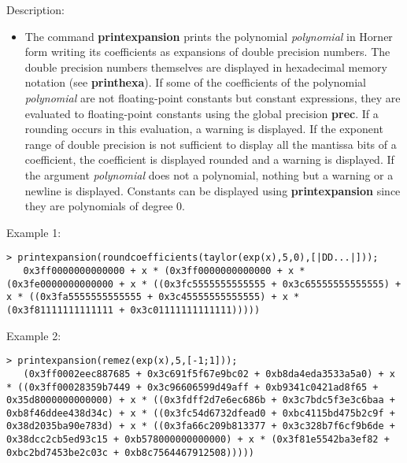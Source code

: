 \noindent Description: \begin{itemize}

\item The command \textbf{printexpansion} prints the polynomial \emph{polynomial} in Horner form
   writing its coefficients as expansions of double precision
   numbers. The double precision numbers themselves are displayed in
   hexadecimal memory notation (see \textbf{printhexa}). 
   If some of the coefficients of the polynomial \emph{polynomial} are not
   floating-point constants but constant expressions, they are evaluated
   to floating-point constants using the global precision \textbf{prec}.  If a
   rounding occurs in this evaluation, a warning is displayed.
   If the exponent range of double precision is not sufficient to display
   all the mantissa bits of a coefficient, the coefficient is displayed
   rounded and a warning is displayed.
   If the argument \emph{polynomial} does not a polynomial, nothing but a
   warning or a newline is displayed. Constants can be displayed using
   \textbf{printexpansion} since they are polynomials of degree $0$.
\end{itemize}
\noindent Example 1: 
\begin{center}\begin{minipage}{14.8cm}\begin{Verbatim}[frame=single]
   > printexpansion(roundcoefficients(taylor(exp(x),5,0),[|DD...|]));
   0x3ff0000000000000 + x * (0x3ff0000000000000 + x * (0x3fe0000000000000 + x * ((0x3fc5555555555555 + 0x3c65555555555555) + x * ((0x3fa5555555555555 + 0x3c45555555555555) + x * (0x3f81111111111111 + 0x3c01111111111111)))))
\end{Verbatim}
\end{minipage}\end{center}
\noindent Example 2: 
\begin{center}\begin{minipage}{14.8cm}\begin{Verbatim}[frame=single]
   > printexpansion(remez(exp(x),5,[-1;1]));
   (0x3ff0002eec887685 + 0x3c691f5f67e9bc02 + 0xb8da4eda3533a5a0) + x * ((0x3ff00028359b7449 + 0x3c96606599d49aff + 0xb9341c0421ad8f65 + 0x35d8000000000000) + x * ((0x3fdff2d7e6ec686b + 0x3c7bdc5f3e3c6baa + 0xb8f46ddee438d34c) + x * ((0x3fc54d6732dfead0 + 0xbc4115bd475b2c9f + 0x38d2035ba90e783d) + x * ((0x3fa66c209b813377 + 0x3c328b7f6cf9b6de + 0x38dcc2cb5ed93c15 + 0xb578000000000000) + x * (0x3f81e5542ba3ef82 + 0xbc2bd7453be2c03c + 0xb8c7564467912508)))))
\end{Verbatim}
\end{minipage}\end{center}
